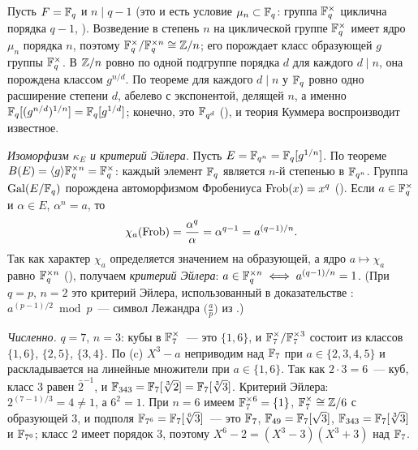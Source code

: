 \begin{example}
Пусть $F=\mathbb F_q$ и $n\mid q-1$ (это и есть условие $\mu_n\subset\mathbb F_q$: группа $\mathbb F_q^\times$ циклична порядка $q-1$, ).
Возведение в степень $n$ на циклической группе $\mathbb F_q^\times$ имеет ядро $\mu_n$ порядка $n$, поэтому
$\mathbb F_q^\times/\mathbb F_q^{\times n}\cong\mathbb Z/n$; его порождает класс образующей $g$ группы $\mathbb F_q^\times$. В $\mathbb Z/n$ ровно по одной
подгруппе порядка $d$ для каждого $d\mid n$, она порождена классом $g^{n/d}$. По теореме  для каждого $d\mid n$ у
$\mathbb F_q$ ровно одно расширение степени $d$, абелево с экспонентой, делящей $n$, а именно
$\mathbb F_q[(g^{n/d})^{1/n}]=\mathbb F_q[g^{1/d}]$; конечно, это $\mathbb F_{q^d}$ (), и теория Куммера воспроизводит известное.

\emph{Изоморфизм $\kappa_E$ и критерий Эйлера.} Пусть $E=\mathbb F_{q^n}=\mathbb F_q[g^{1/n}]$. По теореме 
$B(E)=\langle g\rangle\mathbb F_q^{\times n}=\mathbb F_q^\times$: каждый элемент $\mathbb F_q$ является $n$-й степенью в $\mathbb F_{q^n}$. Группа
$\operatorname{Gal}(E/\mathbb F_q)$ порождена автоморфизмом Фробениуса $\operatorname{Frob}(x)=x^q$ (). Если $a\in\mathbb F_q^\times$ и $\alpha\in E$, $\alpha^n=a$, то
\[
\chi_a(\operatorname{Frob})=\frac{\alpha^q}{\alpha}=\alpha^{q-1}=a^{(q-1)/n}.
\]
Так как характер $\chi_a$ определяется значением на образующей, а ядро $a\mapsto\chi_a$ равно $\mathbb F_q^{\times n}$ (),
получаем \emph{критерий Эйлера}: $a\in\mathbb F_q^{\times n}\iff a^{(q-1)/n}=1$. (При $q=p$, $n=2$ это критерий Эйлера,
использованный в доказательстве : $a^{(p-1)/2}\bmod p$~--- символ Лежандра $\bigl(\frac ap\bigr)$ из .)

\emph{Численно.} $q=7$, $n=3$: кубы в $\mathbb F_7^\times$~--- это $\{1,6\}$, и $\mathbb F_7^\times/\mathbb F_7^{\times3}$ состоит из классов
$\{1,6\}$, $\{2,5\}$, $\{3,4\}$. По (c) $X^3-a$ неприводим над $\mathbb F_7$ при $a\in\{2,3,4,5\}$ и раскладывается на
линейные множители при $a\in\{1,6\}$. Так как $2\cdot3=6$~--- куб, класс $3$ равен $\bar2^{-1}$, и
$\mathbb F_{343}=\mathbb F_7[\sqrt[3]2]=\mathbb F_7[\sqrt[3]3]$. Критерий Эйлера: $2^{(7-1)/3}=4\ne1$, а $6^2=1$. При $n=6$ имеем
$\mathbb F_7^{\times6}=\{1\}$, $\mathbb F_7^\times\cong\mathbb Z/6$ с образующей $3$, и подполя $\mathbb F_{7^6}=\mathbb F_7[\sqrt[6]3]$~--- это $\mathbb F_7$,
$\mathbb F_{49}=\mathbb F_7[\sqrt3]$, $\mathbb F_{343}=\mathbb F_7[\sqrt[3]3]$ и $\mathbb F_{7^6}$; класс $2$ имеет порядок $3$, поэтому
$X^6-2=(X^3-3)(X^3+3)$ над $\mathbb F_7$.
\end{example}

